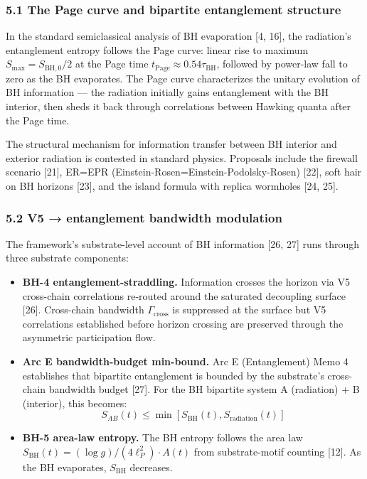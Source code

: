 \documentclass[
  11pt,
  a4paperpaper,
]{article}
\begin{document}
\subsubsection{5.1 The Page curve and bipartite entanglement
structure}\label{the-page-curve-and-bipartite-entanglement-structure}

In the standard semiclassical analysis of BH evaporation {[}4, 16{]},
the radiation's entanglement entropy follows the Page curve: linear rise
to maximum \(S_{\mathrm{max}} = S_{\mathrm{BH,0}}/2\) at the Page time
\(t_{\mathrm{Page}} \approx 0.54 \tau_{\mathrm{BH}}\), followed by
power-law fall to zero as the BH evaporates. The Page curve
characterizes the unitary evolution of BH information --- the radiation
initially gains entanglement with the BH interior, then sheds it back
through correlations between Hawking quanta after the Page time.

The structural mechanism for information transfer between BH interior
and exterior radiation is contested in standard physics. Proposals
include the firewall scenario {[}21{]}, ER=EPR
(Einstein-Rosen=Einstein-Podolsky-Rosen) {[}22{]}, soft hair on BH
horizons {[}23{]}, and the island formula with replica wormholes {[}24,
25{]}.

\subsubsection{5.2 V5 → entanglement bandwidth
modulation}\label{v5-entanglement-bandwidth-modulation}

The framework's substrate-level account of BH information {[}26, 27{]}
runs through three substrate components:

\begin{itemize}
\item
  \textbf{BH-4 entanglement-straddling.} Information crosses the horizon
  via V5 cross-chain correlations re-routed around the saturated
  decoupling surface {[}26{]}. Cross-chain bandwidth
  \(\Gamma_{\mathrm{cross}}\) is suppressed at the surface but V5
  correlations established before horizon crossing are preserved through
  the asymmetric participation flow.
\item
  \textbf{Arc E bandwidth-budget min-bound.} Arc E (Entanglement) Memo 4
  establishes that bipartite entanglement is bounded by the substrate's
  cross-chain bandwidth budget {[}27{]}. For the BH bipartite system A
  (radiation) + B (interior), this becomes:
  \[S_{AB}(t) \leq \min[S_{\mathrm{BH}}(t), S_{\mathrm{radiation}}(t)]\]
\item
  \textbf{BH-5 area-law entropy.} The BH entropy follows the area law
  \(S_{\mathrm{BH}}(t) = (\log g)/(4\ell_P^2) \cdot A(t)\) from
  substrate-motif counting {[}12{]}. As the BH evaporates,
  \(S_{\mathrm{BH}}\) decreases.
\end{itemize}
\end{document}
